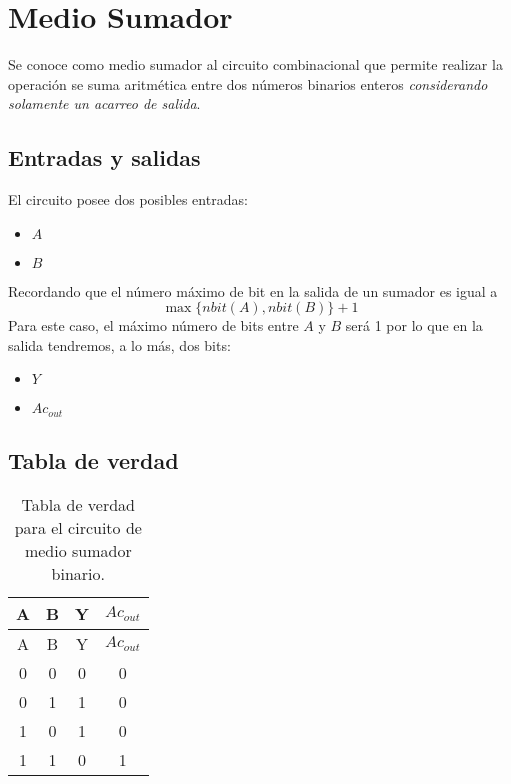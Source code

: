 \documentclass[
]{book}
\providecommand{\tightlist}{%
  \setlength{\itemsep}{0pt}\setlength{\parskip}{0pt}}
\begin{document}
\hypertarget{medio-sumador}{%
\section{Medio Sumador}\label{medio-sumador}}

Se conoce como medio sumador al circuito combinacional que permite realizar la operación se suma aritmética entre dos números binarios enteros \emph{considerando solamente un acarreo de salida}.

\hypertarget{entradas-y-salidas}{%
\subsection{Entradas y salidas}\label{entradas-y-salidas}}

El circuito posee dos posibles entradas:

\begin{itemize}
\tightlist
\item
  \(A\)
\item
  \(B\)
\end{itemize}

Recordando que el número máximo de bit en la salida de un sumador es igual a \[
  \max\{nbit(A), nbit(B)\}+1
\] Para este caso, el máximo número de bits entre \(A\) y \(B\) será 1 por lo que en la salida tendremos, a lo más, dos bits:

\begin{itemize}
\tightlist
\item
  \(Y\)
\item
  \(Ac_{out}\)
\end{itemize}

\hypertarget{tabla-de-verdad}{%
\subsection{Tabla de verdad}\label{tabla-de-verdad}}

\begin{longtable}[]{@{}cccc@{}}
\caption{Tabla de verdad para el circuito de medio sumador binario.}\tabularnewline
\toprule
A & B & Y & \(Ac_{out}\) \\
\midrule
\endfirsthead
\toprule
A & B & Y & \(Ac_{out}\) \\
\midrule
\endhead
0 & 0 & 0 & 0 \\
0 & 1 & 1 & 0 \\
1 & 0 & 1 & 0 \\
1 & 1 & 0 & 1 \\
\bottomrule
\end{longtable}
\end{document}
